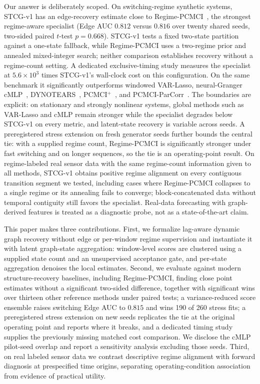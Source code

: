 \documentclass[sigconf,anonymous]{acmart}
\begin{document}
Our answer is deliberately scoped.
On switching-regime synthetic systems, STCG-v1 has an edge-recovery estimate close to Regime-PCMCI~\cite{saggioro2020regime}, the strongest regime-aware specialist (Edge AUC $0.812$ versus $0.816$ over twenty shared seeds, two-sided paired $t$-test $p=0.668$). STCG-v1 tests a fixed two-state partition against a one-state fallback, while Regime-PCMCI uses a two-regime prior and annealed mixed-integer search; neither comparison establishes recovery without a regime-count setting. A dedicated exclusive-timing study measures the specialist at $5.6\times10^{3}$ times STCG-v1's wall-clock cost on this configuration.
On the same benchmark it significantly outperforms windowed VAR-Lasso, neural-Granger cMLP~\cite{tank2021neural}, DYNOTEARS~\cite{pamfil2020dynotears}, PCMCI$^+$~\cite{runge2020pcmciplus}, and PCMCI-ParCorr~\cite{runge2019detecting}.
The boundaries are explicit: on stationary and strongly nonlinear systems, global methods such as VAR-Lasso and cMLP remain stronger while the specialist degrades below STCG-v1 on every metric, and latent-state recovery is variable across seeds. A preregistered stress extension on fresh generator seeds further bounds the central tie: with a supplied regime count, Regime-PCMCI is significantly stronger under fast switching and on longer sequences, so the tie is an operating-point result.
On regime-labeled real sensor data with the same regime-count information given to all methods, STCG-v1 obtains positive regime alignment on every contiguous transition segment we tested, including cases where Regime-PCMCI collapses to a single regime or its annealing fails to converge; block-concatenated data without temporal contiguity still favors the specialist.
Real-data forecasting with graph-derived features is treated as a diagnostic probe, not as a state-of-the-art claim.

This paper makes three contributions.
First, we formalize lag-aware dynamic graph recovery without edge or per-window regime supervision and instantiate it with latent graph-state aggregation: window-level scores are clustered using a supplied state count and an unsupervised acceptance gate, and per-state aggregation denoises the local estimates.
Second, we evaluate against modern structure-recovery baselines, including Regime-PCMCI, finding close point estimates without a significant two-sided difference, together with significant wins over thirteen other reference methods under paired tests; a variance-reduced score ensemble raises switching Edge AUC to $0.815$ and wins 190 of 260 stress fits; a preregistered stress extension on new seeds replicates the tie at the original operating point and reports where it breaks, and a dedicated timing study supplies the previously missing matched cost comparison. We disclose the cMLP pilot-seed overlap and report a sensitivity analysis excluding those seeds.
Third, on real labeled sensor data we contrast descriptive regime alignment with forward diagnosis at prespecified time origins, separating operating-condition association from evidence of practical utility.
\end{document}

